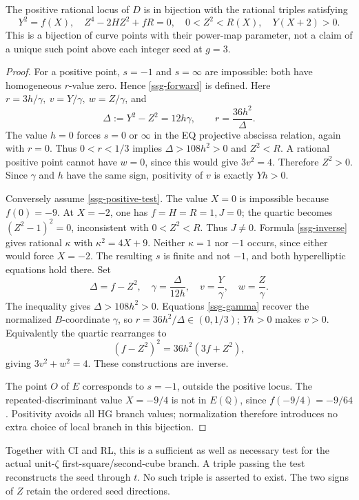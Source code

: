 \begin{theorem}\label{ssg-positive}
The positive rational locus of \(D\) is in bijection with the rational
triples satisfying
\begin{equation}\label{ssg-positive-test}
 Y^2=f(X),\quad Z^4-2HZ^2+fR=0,\quad
 0<Z^2<R(X),\quad Y(X+2)>0.
\end{equation}
This is a bijection of curve points with their power-map parameter,
not a claim of a unique such point above each integer seed at \(g=3\).
\end{theorem}
\begin{proof}
For a positive point, \(s=-1\) and \(s=\infty\) are impossible:
both have homogeneous \(r\)-value zero. Hence \eqref{ssg-forward}
is defined. Here \(r=3h/\gamma,\ v=Y/\gamma,\ w=Z/\gamma\), and
\begin{equation}\label{ssg-delta}
 \Delta:=Y^2-Z^2=12h\gamma,\qquad r=\frac{36h^2}{\Delta}.
\end{equation}
The value \(h=0\) forces \(s=0\) or \(\infty\) in the EQ
projective abscissa relation, again with \(r=0\). Thus \(0<r<1/3\)
implies \(\Delta>108h^2>0\) and \(Z^2<R\).
A rational positive point cannot have \(w=0\), since this would give
\(3v^2=4\). Therefore \(Z^2>0\). Since \(\gamma\) and \(h\) have
the same sign, positivity of \(v\) is exactly \(Yh>0\).

Conversely assume \eqref{ssg-positive-test}. The value \(X=0\) is
impossible because \(f(0)=-9\). At \(X=-2\), one has
\(f=H=R=1,J=0\); the quartic becomes \((Z^2-1)^2=0\), inconsistent
with \(0<Z^2<R\). Thus \(J\ne0\).
Formula \eqref{ssg-inverse} gives rational \(\kappa\) with
\(\kappa^2=4X+9\). Neither \(\kappa=1\) nor \(-1\) occurs,
since either would force \(X=-2\). The resulting \(s\) is finite
and not \(-1\), and both hyperelliptic equations hold there. Set
\begin{equation}\label{ssg-positive-inverse}
 \Delta=f-Z^2,\quad \gamma=\frac{\Delta}{12h},\quad
 v=\frac{Y}{\gamma},\quad w=\frac{Z}{\gamma}.
\end{equation}
The inequality gives \(\Delta>108h^2>0\).
Equations \eqref{ssg-gamma} recover the normalized \(B\)-coordinate
\(\gamma\), so \(r=36h^2/\Delta\in(0,1/3)\);
\(Yh>0\) makes \(v>0\). Equivalently the quartic rearranges to
\begin{equation}\label{ssg-conic}
 (f-Z^2)^2=36h^2(3f+Z^2),
\end{equation}
giving \(3v^2+w^2=4\). These constructions are inverse.

The point \(O\) of \(E\) corresponds to \(s=-1\), outside the positive
locus. The repeated-discriminant value \(X=-9/4\) is not in
\(E(\mathbb Q)\), since \(f(-9/4)=-9/64\).
Positivity avoids all HG branch values; normalization therefore
introduces no extra choice of local branch in this bijection.
\end{proof}
Together with CI and RL, this is a sufficient as well as necessary
test for the actual unit-\(\zeta\) first-square/second-cube branch.
A triple passing the test reconstructs the seed through \(t\).
No such triple is asserted to exist. The two signs of \(Z\)
retain the ordered seed directions.

